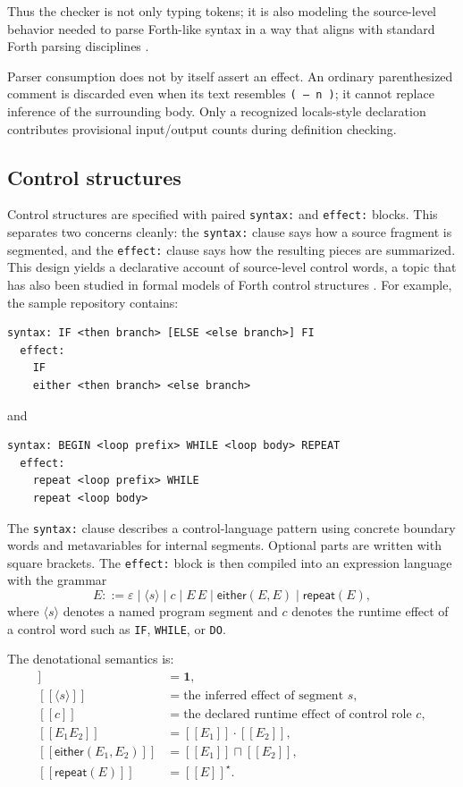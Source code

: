 \documentclass[acmsmall,screen,review,anonymous,nonacm]{acmart}
\newcommand{\glb}{\mathbin{\sqcap}}
\newcommand{\compose}{\mathbin{\cdot}}
\newcommand{\eps}{\varepsilon}
\newcommand{\id}{\mathbf{1}}
\newcommand{\sem}[1]{[\![#1]\!]}
\begin{document}
Thus the checker is not only typing tokens; it is also modeling the source-level behavior needed to parse Forth-like syntax in a way that aligns with standard Forth parsing disciplines \cite{forth2012standard}.

Parser consumption does not by itself assert an effect. An ordinary
parenthesized comment is discarded even when its text resembles
\texttt{( -- n )}; it cannot replace inference of the surrounding body. Only a
recognized locals-style declaration contributes provisional input/output counts
during definition checking.

\subsection{Control structures}
Control structures are specified with paired \texttt{syntax:} and \texttt{effect:} blocks. This separates two concerns cleanly: the \texttt{syntax:} clause says how a source fragment is segmented, and the \texttt{effect:} clause says how the resulting pieces are summarized. This design yields a declarative account of source-level control words, a topic that has also been studied in formal models of Forth control structures \cite{power2004formal}. For example, the sample repository contains:
\begin{lstlisting}
syntax: IF <then branch> [ELSE <else branch>] FI
  effect:
    IF
    either <then branch> <else branch>
\end{lstlisting}

and
\begin{lstlisting}
syntax: BEGIN <loop prefix> WHILE <loop body> REPEAT
  effect:
    repeat <loop prefix> WHILE
    repeat <loop body>
\end{lstlisting}

The \texttt{syntax:} clause describes a control-language pattern using concrete boundary words and metavariables for internal segments. Optional parts are written with square brackets. The \texttt{effect:} block is then compiled into an expression language with the grammar
\[
E ::= \eps \mid \langle s \rangle \mid c \mid E\,E \mid \textsf{either}(E,E) \mid \textsf{repeat}(E),
\]
where $\langle s \rangle$ denotes a named program segment and $c$ denotes the runtime effect of a control word such as \texttt{IF}, \texttt{WHILE}, or \texttt{DO}.

The denotational semantics is:
\begin{align*}
\sem{\eps} &= \id,\\
\sem{\langle s \rangle} &= \text{the inferred effect of segment } s,\\
\sem{c} &= \text{the declared runtime effect of control role } c,\\
\sem{E_1 E_2} &= \sem{E_1} \compose \sem{E_2},\\
\sem{\textsf{either}(E_1,E_2)} &= \sem{E_1} \glb \sem{E_2},\\
\sem{\textsf{repeat}(E)} &= \sem{E}^\star.
\end{align*}
\end{document}
